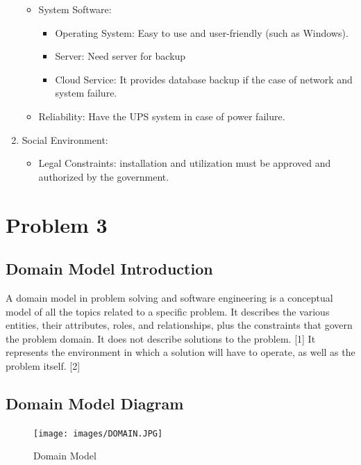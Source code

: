 \documentclass[11pt,oneside]{book}
\begin{document}
\begin{enumerate}
\begin{itemize}
\begin{itemize}
 \end{itemize} 
 \item System Software:
 \begin{itemize}
 
\item Operating System: Easy to use and user-friendly (such as Windows).
\item Server: Need server for backup
\item Cloud Service: It provides database backup if the case of network and system failure.

 \end{itemize} 

\item Reliability: Have the UPS system in case of power failure.

        \end{itemize}


\item Social Environment:
\begin{itemize}
\item	Legal Constraints: installation and utilization must be approved and authorized by the government.

\end{itemize}       
  
\end{enumerate}



\chapter{Problem 3}

\section{Domain Model Introduction}
A domain model in problem solving and software engineering is a conceptual model of all the topics related to a specific problem. It describes the various entities, their attributes, roles, and relationships, plus the constraints that govern the problem domain. It does not describe solutions to the problem. [1] It represents the environment in which a solution will have to operate, as well as the problem itself. [2]

\section{Domain Model Diagram}

\begin{figure}[htp]
 \texttt{[image: images/DOMAIN.JPG]}
    \centering
    \caption{Domain Model}
\end{figure}
\end{document}
